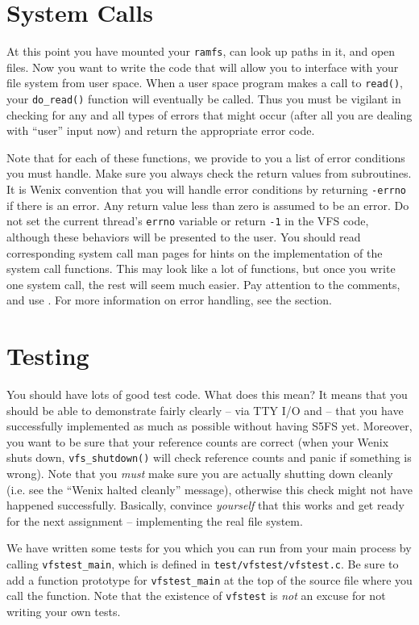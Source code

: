\section{System Calls}

At this point you have mounted your \texttt{ramfs}, can look up paths in it, and open files. Now you want to write the code that will allow you to interface with your file system from user space. When a user space program makes a call to \texttt{read()}, your \texttt{do\_read()} function will eventually be called. Thus you must be vigilant in checking for any and all types of errors that might occur (after all you are dealing with ``user'' input now) and return the appropriate error code.

Note that for each of these functions, we provide to you a list of error
conditions you must handle.  Make sure you always check the return values from
subroutines. It is Wenix convention that you will handle error
conditions by returning \texttt{-errno} if there is an error. Any return value less than zero is
assumed to be an error. Do not set the current thread's \texttt{errno} variable or return \texttt{-1} in the VFS code, although these behaviors will be presented to the user. You should read corresponding system call man pages for
hints on the implementation of the system call functions. This may look like a lot of
functions, but once you write one system call, the rest will seem much easier.
Pay attention to the comments, and use . For
more information on error handling, see the  section.

\section{Testing}

You should have lots of good test code. What does this mean? It means that you should be able to demonstrate fairly clearly -- via TTY I/O and  -- that you have successfully implemented as much as possible without having S5FS yet. Moreover, you want to be sure that your reference counts are correct (when your Wenix shuts down, \texttt{vfs\_shutdown()} will check reference counts and panic if something is wrong). Note that you \emph{must} make sure you are actually shutting down cleanly (i.e. see the ``Wenix halted cleanly'' message), otherwise this check might not have happened successfully. Basically, convince \emph{yourself} that this works and get ready for the next assignment -- implementing the real file system.

We have written some tests for you which you can run from your main process by
calling \texttt{vfstest\_main}, which is defined in \texttt{test/vfstest/vfstest.c}. Be sure to add a function prototype for
\texttt{vfstest\_main} at the top of the source file where you call the function.
Note that the existence of \texttt{vfstest} is \emph{not} an excuse for not writing your own tests.

